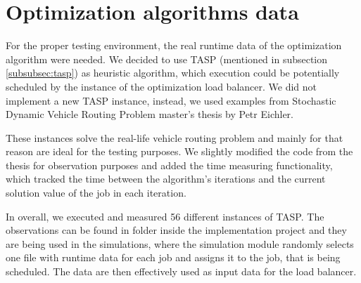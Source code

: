 \section{Optimization algorithms data}\label{sec:optimization-algorithms-data}
For the proper testing environment,
the real runtime data of the optimization algorithm were needed.
We decided to use TASP (mentioned in subsection \ref{subsubsec:tasp}) as heuristic algorithm,
which execution could be potentially scheduled by the instance of the optimization load balancer.
We did not implement a new TASP instance,
instead,
we used examples from Stochastic Dynamic Vehicle Routing Problem master's thesis by Petr Eichler\cite{Eichler:Petr:2003}.

These instances solve the real-life vehicle routing problem 
and mainly for that reason are ideal for the testing purposes.
We slightly modified the code from the thesis for observation purposes
and added the time measuring functionality,
which tracked the time between the algorithm's iterations and the current solution value of the job in each iteration.

In overall,
we executed and measured 56 different instances of TASP.
The observations can be found in  folder inside the implementation project
and they are being used in the simulations,
where the simulation module randomly selects one file with runtime data for each job 
and assigns it to the job, that is being scheduled.
The data are then effectively used as input data for the load balancer.